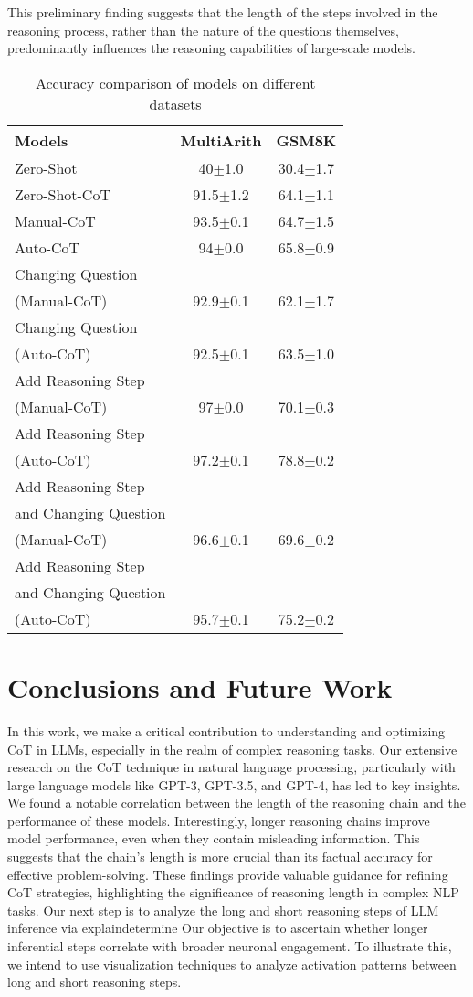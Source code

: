 \documentclass[11pt]{article}
\begin{document}
This preliminary finding suggests that the length of the steps involved in the reasoning process, rather than the nature of the questions themselves, predominantly influences the reasoning capabilities of large-scale models.

\begin{table}[t]
\small
\centering
\caption{Accuracy comparison of models on different datasets}
\begin{tabular}{lcc}
\toprule
Models & MultiArith & GSM8K \\
\midrule
Zero-Shot & 40$\pm$1.0 & 30.4$\pm$1.7 \\
Zero-Shot-CoT & 91.5$\pm$1.2 & 64.1$\pm$1.1 \\
Manual-CoT & 93.5$\pm$0.1 & 64.7$\pm$1.5 \\
Auto-CoT & 94$\pm$0.0 & 65.8$\pm$0.9 \\
\hline %
Changing Question \\(Manual-CoT) & 92.9$\pm$0.1 & 62.1$\pm$1.7 \\
Changing Question \\(Auto-CoT) & 92.5$\pm$0.1 & 63.5$\pm$1.0 \\
\hline
Add Reasoning Step \\(Manual-CoT) & 97$\pm$0.0 & 70.1$\pm$0.3 \\
Add Reasoning Step \\(Auto-CoT) & 97.2$\pm$0.1 & 78.8$\pm$0.2 \\
\hline
Add Reasoning Step \\and Changing Question\\(Manual-CoT) & 96.6$\pm$0.1 & 69.6$\pm$0.2 \\
Add Reasoning Step \\and Changing Question\\(Auto-CoT) & 95.7$\pm$0.1 & 75.2$\pm$0.2 \\
\bottomrule
\end{tabular}
\label{tab:case1}
\end{table}
\section{Conclusions and Future Work}
In this work, we make a critical contribution to understanding and optimizing CoT in LLMs, especially in the realm of complex reasoning tasks. Our extensive research on the CoT technique in natural language processing, particularly with large language models like GPT-3, GPT-3.5, and GPT-4, has led to key insights. We found a notable correlation between the length of the reasoning chain and the performance of these models. Interestingly, longer reasoning chains improve model performance, even when they contain misleading information. This suggests that the chain's length is more crucial than its factual accuracy for effective problem-solving. These findings provide valuable guidance for refining CoT strategies, highlighting the significance of reasoning length in complex NLP tasks.
%
Our next step is to analyze the long and short reasoning steps of LLM inference via explaindetermine%
Our objective is to ascertain whether longer inferential steps correlate with broader neuronal engagement. To illustrate this, we intend to use visualization techniques to analyze activation patterns between long and short reasoning steps.
%
\end{document}
